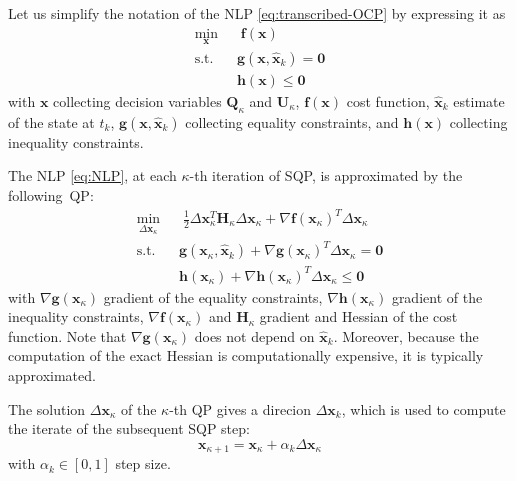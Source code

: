 Let us simplify the notation of the NLP \eqref{eq:transcribed-OCP}
by expressing it as
\begin{equation}
    \label{eq:NLP}
    \begin{aligned}
        \min_{\bm{x}} \;\;
            & \; \bm{f}(\bm{x}) \\
            \text{s.t. } & \bm{g}(\bm{x}, \hat{\bm{x}}_k) = \bm{0} \\
                         & \bm{h}(\bm{x}) \le \bm{0}
    \end{aligned}
\end{equation}
with $\bm{x}$ collecting decision variables $\bm{Q}_{\kappa}$ and $\bm{U}_{\kappa}$,
$\bm{f}(\bm{x})$ cost function,
$\hat{\bm{x}}_k$ estimate of the state at $t_k$,
$\bm{g}(\bm{x}, \hat{\bm{x}}_k)$ collecting equality
constraints, and $\bm{h}(\bm{x})$ collecting inequality constraints.

The NLP \eqref{eq:NLP}, at each $\kappa$-th iteration of SQP, is approximated 
by the following~QP:
\begin{equation}
    \label{eq:QP}
    \begin{aligned}
        \min_{\Delta \bm{x}_{\kappa}} \;\;
            & \; \frac{1}{2} \Delta \bm{x}_{\kappa}^T \bm{H}_{\kappa} \Delta \bm{x}_{\kappa} + \nabla \bm{f}(\bm{x}_{\kappa})^T \Delta \bm{x}_{\kappa}  \\
            \text{s.t. } & \bm{g}(\bm{x}_{\kappa}, \hat{\bm{x}}_k) + \nabla \bm{g}({\bm{x}_{\kappa}})^T \Delta \bm{x}_{\kappa}   = \bm{0} \\
                         & \bm{h}(\bm{x}_{\kappa}) + \nabla \bm{h}({\bm{x}_{\kappa}})^T \Delta \bm{x}_{\kappa} \le \bm{0}
    \end{aligned}
\end{equation}
with $\nabla \bm{g}({\bm{x}_{\kappa}})$ gradient of the equality constraints,
$\nabla \bm{h}({\bm{x}_{\kappa}})$ gradient of the inequality constraints,
$\nabla \bm{f}(\bm{x}_{\kappa})$ and $\bm{H}_{\kappa}$ gradient and Hessian
of the cost function. Note that $\nabla \bm{g}({\bm{x}_{\kappa}})$ does not 
depend on $\hat{\bm{x}}_k$. Moreover, because the computation of the exact Hessian is 
computationally expensive, it is typically approximated.

The solution $\Delta \bm{x}_{\kappa}$ of the $\kappa$-th QP gives a direcion $\Delta \bm{x}_k$, which is 
used to compute the iterate of the subsequent SQP step:
\begin{equation*}
    \bm{x}_{\kappa+1} = \bm{x}_{\kappa} + \alpha_k \Delta \bm{x}_{\kappa}
\end{equation*}
with $\alpha_k \in [0, 1]$ step size.

